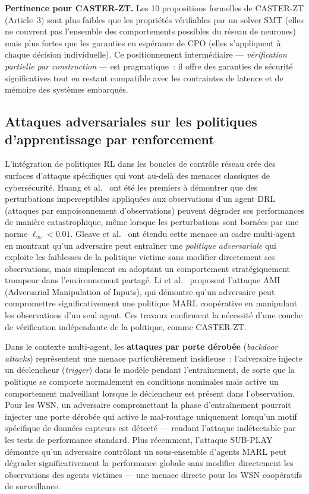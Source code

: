\textbf{Pertinence pour CASTER-ZT.} Les 10 propositions formelles de CASTER-ZT (Article~3) sont plus faibles que les propriétés vérifiables par un solver SMT (elles ne couvrent pas l'ensemble des comportements possibles du réseau de neurones) mais plus fortes que les garanties en espérance de CPO (elles s'appliquent à chaque décision individuelle). Ce positionnement intermédiaire --- \emph{vérification partielle par construction} --- est pragmatique~: il offre des garanties de sécurité significatives tout en restant compatible avec les contraintes de latence et de mémoire des systèmes embarqués.

\subsection{Attaques adversariales sur les politiques d'apprentissage par renforcement}

L'intégration de politiques RL dans les boucles de contrôle réseau crée des surfaces d'attaque spécifiques qui vont au-delà des menaces classiques de cybersécurité. Huang et al.\ \cite{Huang2017AdvRL} ont été les premiers à démontrer que des perturbations imperceptibles appliquées aux observations d'un agent DRL (attaques par empoisonnement d'observations) peuvent dégrader ses performances de manière catastrophique, même lorsque les perturbations sont bornées par une norme $\ell_\infty < 0.01$. Gleave et al.\ \cite{Gleave2020AdvPolicies} ont étendu cette menace au cadre multi-agent en montrant qu'un adversaire peut entraîner une \emph{politique adversariale} qui exploite les faiblesses de la politique victime sans modifier directement ses observations, mais simplement en adoptant un comportement stratégiquement trompeur dans l'environnement partagé. Li et al.~\cite{ami_attack_marl2024} proposent l'attaque AMI (Adversarial Manipulation of Inputs), qui démontre qu'un adversaire peut compromettre significativement une politique MARL coopérative en manipulant les observations d'un seul agent. Ces travaux confirment la nécessité d'une couche de vérification indépendante de la politique, comme CASTER-ZT.

Dans le contexte multi-agent, les \textbf{attaques par porte dérobée} (\emph{backdoor attacks}) \cite{Kiourti2021BackdoorDRL} représentent une menace particulièrement insidieuse~: l'adversaire injecte un déclencheur (\emph{trigger}) dans le modèle pendant l'entraînement, de sorte que la politique se comporte normalement en conditions nominales mais active un comportement malveillant lorsque le déclencheur est présent dans l'observation. Pour les WSN, un adversaire compromettant la phase d'entraînement pourrait injecter une porte dérobée qui active le mal-routage uniquement lorsqu'un motif spécifique de données capteurs est détecté --- rendant l'attaque indétectable par les tests de performance standard. Plus récemment, l'attaque SUB-PLAY \cite{subplay_marl2025} démontre qu'un adversaire contrôlant un sous-ensemble d'agents MARL peut dégrader significativement la performance globale sans modifier directement les observations des agents victimes --- une menace directe pour les WSN coopératifs de surveillance.

